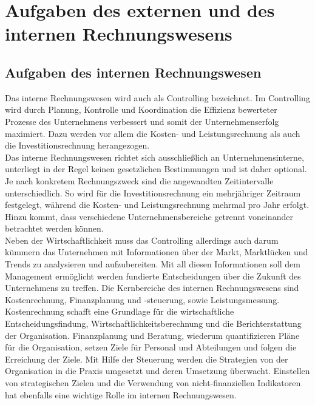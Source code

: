 %
\section{Aufgaben des externen und des internen Rechnungswesens}

\subsection{Aufgaben des internen Rechnungswesen}
Das interne Rechnungswesen wird auch als Controlling bezeichnet. Im Controlling wird durch Planung, Kontrolle und Koordination die Effizienz bewerteter Prozesse des Unternehmens verbessert und somit der Unternehmenserfolg maximiert. Dazu werden vor allem die Kosten- und Leistungsrechnung als auch die Investitionsrechnung herangezogen.
\\
Das interne Rechnungswesen richtet sich ausschließlich an Unternehmensinterne, unterliegt in der Regel keinen gesetzlichen Bestimmungen und ist daher optional. Je nach konkretem Rechnungszweck sind die angewandten Zeitintervalle unterschiedlich. So wird für die Investitionsrechnung ein mehrjähriger Zeitraum festgelegt, während die Kosten- und Leistungsrechnung mehrmal pro Jahr erfolgt. Hinzu kommt, dass verschiedene Unternehmensbereiche getrennt voneinander betrachtet werden können.
\\
Neben der Wirtschaftlichkeit muss das Controlling allerdings auch darum kümmern das Unternehmen mit Informationen über der Markt, Marktlücken und Trends zu analysieren und aufzubereiten. Mit all diesen Informationen soll dem Management ermöglicht werden fundierte Entscheidungen über die Zukunft des Unternehmens zu treffen.
Die Kernbereiche des internen Rechnungswesens sind Kostenrechnung, Finanzplanung und -steuerung, sowie Leistungsmessung. 
\\
Kostenrechnung schafft eine Grundlage für die wirtschaftliche Entscheidungsfindung, Wirtschaftlichkeitsberechnung und die Berichterstattung der Organisation. Finanzplanung und Beratung, wiederum quantifizieren Pläne für die Organisation, setzen Ziele für Personal und Abteilungen und folgen die Erreichung der Ziele. Mit Hilfe der Steuerung werden die Strategien von der Organisation in die Praxis umgesetzt und deren Umsetzung überwacht. Einstellen von strategischen Zielen und die Verwendung von nicht-finanziellen Indikatoren hat ebenfalls eine wichtige Rolle im internen Rechnungswesen.

